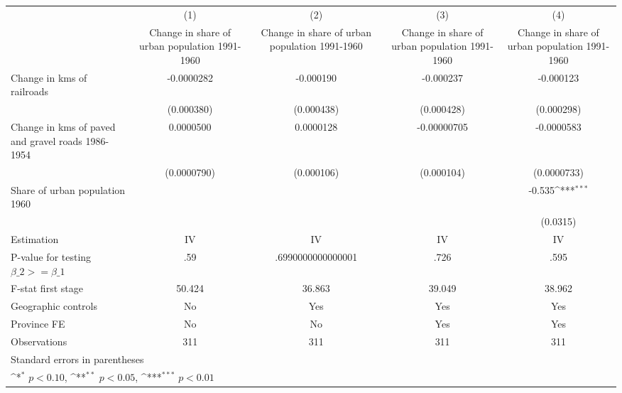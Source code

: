 {
\def\sym#1{\ifmmode^{#1}\else\(^{#1}\)\fi}
\begin{tabular}{l*{4}{c}}
\hline\hline
                &\multicolumn{1}{c}{(1)}&\multicolumn{1}{c}{(2)}&\multicolumn{1}{c}{(3)}&\multicolumn{1}{c}{(4)}\\
                &\multicolumn{1}{c}{Change in share of urban population 1991-1960}&\multicolumn{1}{c}{Change in share of urban population 1991-1960}&\multicolumn{1}{c}{Change in share of urban population 1991-1960}&\multicolumn{1}{c}{Change in share of urban population 1991-1960}\\
\hline
Change in kms of railroads&-0.0000282         &-0.000190         &-0.000237         &-0.000123         \\
                &(0.000380)         &(0.000438)         &(0.000428)         &(0.000298)         \\
[1em]
Change in kms of paved and gravel roads 1986-1954&0.0000500         &0.0000128         &-0.00000705         &-0.0000583         \\
                &(0.0000790)         &(0.000106)         &(0.000104)         &(0.0000733)         \\
[1em]
Share of urban population 1960&                  &                  &                  &   -0.535\sym{***}\\
                &                  &                  &                  & (0.0315)         \\
\hline
Estimation      &       IV         &       IV         &       IV         &       IV         \\
P-value for testing $\beta\_2 >= \beta\_1$&      .59         &.6990000000000001         &     .726         &     .595         \\
F-stat first stage&   50.424         &   36.863         &   39.049         &   38.962         \\
Geographic controls&       No         &      Yes         &      Yes         &      Yes         \\
Province FE     &       No         &       No         &      Yes         &      Yes         \\
Observations    &      311         &      311         &      311         &      311         \\
\hline\hline
\multicolumn{5}{l}{\footnotesize Standard errors in parentheses}\\
\multicolumn{5}{l}{\footnotesize \sym{*} \(p<0.10\), \sym{**} \(p<0.05\), \sym{***} \(p<0.01\)}\\
\end{tabular}
}

